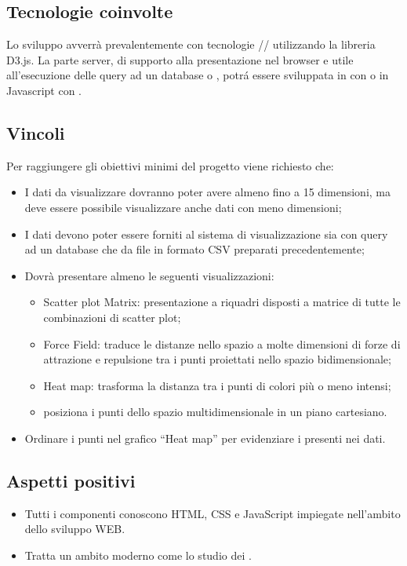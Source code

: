 \subsection{Tecnologie coinvolte}
Lo sviluppo avverrà prevalentemente con tecnologie // utilizzando la libreria D3.js.
La parte server, di supporto alla presentazione nel browser e utile all'esecuzione delle query ad un database  o , potr\'a essere sviluppata in  con  o in Javascript con .

\subsection{Vincoli}
Per raggiungere gli obiettivi minimi del progetto viene richiesto che:
\begin{itemize}
	\item I dati da visualizzare dovranno poter avere almeno fino a 15 dimensioni, ma deve essere possibile visualizzare anche dati con meno dimensioni;
	\item I dati devono poter essere forniti al sistema di visualizzazione sia con query ad un database che da file in formato CSV preparati precedentemente;
	\item Dovrà presentare almeno le seguenti visualizzazioni:
	\begin{itemize}
		\item Scatter plot Matrix: presentazione a riquadri disposti a matrice di tutte le combinazioni di scatter plot;
		\item Force Field: traduce le distanze nello spazio a molte dimensioni di forze di attrazione e repulsione tra i punti proiettati nello spazio bidimensionale;
		\item Heat map: trasforma la distanza tra i punti di colori più o meno intensi;
		\item posiziona i punti dello spazio multidimensionale in un piano
		cartesiano.
	\end{itemize}
	\item Ordinare i punti nel grafico “Heat map” per evidenziare i  presenti nei dati.
\end{itemize}

\subsection{Aspetti positivi}
\begin{itemize}
	\item Tutti i componenti conoscono HTML, CSS e JavaScript impiegate nell'ambito dello sviluppo WEB.
	\item Tratta un ambito moderno come lo studio dei .
\end{itemize}

